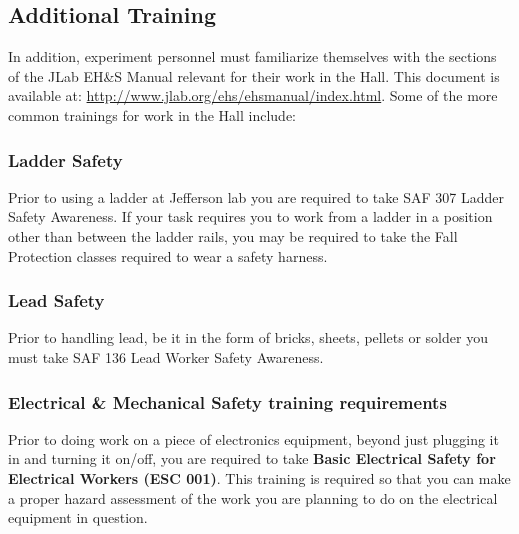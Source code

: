 \documentclass[10pt]{article}
\begin{document}
\subsection{Additional Training}

In addition, experiment personnel must familiarize themselves with the 
sections of the JLab EH\&S Manual relevant for their work in the Hall. 
This document is available  at:  \url{http://www.jlab.org/ehs/ehsmanual/index.html}.
Some of the more common trainings for work in the Hall include: 

\subsubsection{Ladder Safety}

Prior to using a ladder at Jefferson lab you are required to 
take SAF 307 Ladder Safety Awareness.  If your task requires you to work from a 
ladder in a position other than between the ladder rails, you may be required 
to take the Fall Protection classes required to wear a safety harness. 

\subsubsection{Lead Safety}

Prior to handling lead, be it in the form of bricks, sheets, pellets or solder you must take SAF 136 Lead Worker Safety Awareness.

\subsubsection{Electrical \& Mechanical Safety training requirements}
Prior to doing work on a piece of electronics equipment, beyond just plugging it in and turning it on/off, you are required to 
take {\bf Basic Electrical Safety for Electrical Workers (ESC 001)}.
This training is required so that you can make a proper hazard assessment of the work you are planning to do on the electrical equipment in question.
\end{document}
